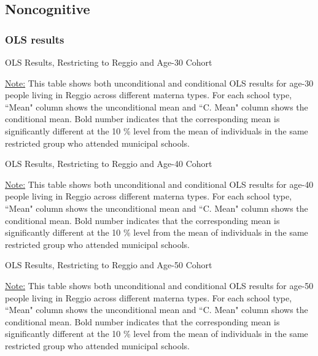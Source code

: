 \documentclass[11pt]{article}
\begin{document}
\subsection{Noncognitive}

\subsubsection{OLS results}
\begin{table}[H]
\begin{center}
	\caption{OLS Results, Restricting to Reggio and Age-30 Cohort} \label{table:OLS-R30-N}
	\scalebox{0.80}{
		
	}
	\end{center}
	\footnotesize
\underline{Note:} This table shows both unconditional and conditional OLS results for age-30 people living in Reggio across different materna types. For each school type, ``Mean" column shows the unconditional mean and ``C. Mean" column shows the conditional mean. Bold number indicates that the corresponding mean is significantly different at the 10 \% level from the mean of individuals in the same restricted group who attended municipal schools.

\end{table}

\begin{table}[H]
\begin{center}
	\caption{OLS Results, Restricting to Reggio and Age-40 Cohort} \label{table:OLS-R40-N}
	\scalebox{0.80}{
		
	}
	\end{center}
	\footnotesize
\underline{Note:} This table shows both unconditional and conditional OLS results for age-40 people living in Reggio across different materna types. For each school type, ``Mean" column shows the unconditional mean and ``C. Mean" column shows the conditional mean. Bold number indicates that the corresponding mean is significantly different at the 10 \% level from the mean of individuals in the same restricted group who attended municipal schools.

\end{table}

\begin{table}[H]
\begin{center}
	\caption{OLS Results, Restricting to Reggio and Age-50 Cohort} \label{table:OLS-R50-N}
	\scalebox{0.80}{
		
	}
	\end{center}
	\footnotesize
\underline{Note:} This table shows both unconditional and conditional OLS results for age-50 people living in Reggio across different materna types. For each school type, ``Mean" column shows the unconditional mean and ``C. Mean" column shows the conditional mean. Bold number indicates that the corresponding mean is significantly different at the 10 \% level from the mean of individuals in the same restricted group who attended municipal schools.

\end{table}
\end{document}
